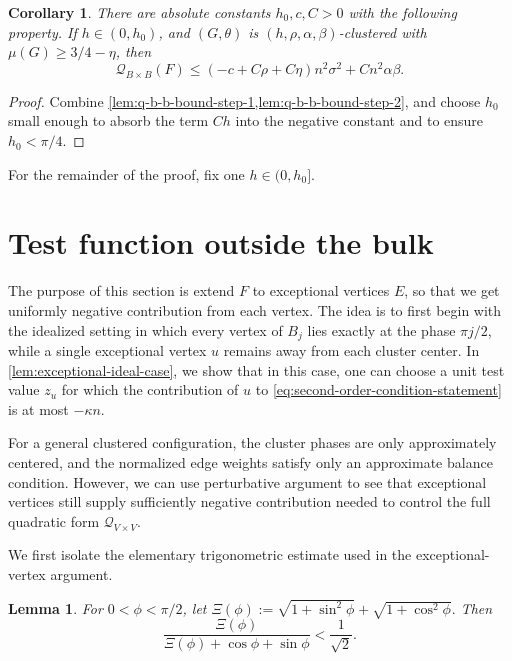 \documentclass[reqno,11pt]{amsart}
\newtheorem{lemma}{Lemma}
\newtheorem{corollary}{Corollary}
\theoremstyle{definition}
\newcommand{\cQ}{\mathcal{Q}}
\newcommand{\paren}[1]{\left(#1\right)}
\begin{document}
\begin{corollary}\label{cor:bulk-bound-main}
There are absolute constants $h_0,c,C>0$ with the following property.
If $h \in (0, h_0)$, and  $(G,\theta)$ is
$(h,\rho,\alpha,\beta)$-clustered with $\mu(G)\ge3/4-\eta$, then
\begin{equation}\label{eq:bulk-bound-main}
\cQ_{B\times B}(F)
\le\paren{-c+C\rho+C\eta}n^2\sigma^2
  +Cn^2\alpha\beta.
\end{equation}
\end{corollary}

\begin{proof}
Combine \cref{lem:q-b-b-bound-step-1,lem:q-b-b-bound-step-2}, and choose
$h_0$ small enough to absorb the term $Ch$ into the negative constant
and to ensure $h_0<\pi/4$.
\end{proof}

For the remainder of the proof, fix one $h\in(0,h_0]$.

\section{Test function outside the bulk}\label{sec:exceptional}

The purpose of this section is extend $F$ to exceptional vertices $E$, so that we get  uniformly negative contribution from each vertex. The idea is to first begin with the idealized setting in which every vertex of \(B_j\) lies exactly at the phase \(\pi j/2\), while a single exceptional vertex \(u\) remains away from each cluster center. In \cref{lem:exceptional-ideal-case}, we show that in this case, one can choose a unit test value \(z_u\) for which the contribution of \(u\) to \eqref{eq:second-order-condition-statement} is at most \(-\kappa n\).

For a general clustered configuration, the cluster phases are only approximately centered, and the normalized edge weights satisfy only an approximate balance condition. However, we can use perturbative argument to see that exceptional vertices still supply sufficiently negative contribution needed to control the full quadratic form \(\cQ_{V\times V}\).

We first isolate the elementary trigonometric estimate used in the exceptional-vertex argument.

\begin{lemma}\label{lem:trig-ineq}
For $0<\phi<\pi/2$, let $\Xi(\phi):=\sqrt{1+\sin^2\phi}+\sqrt{1+\cos^2\phi}.$ Then
\[
    \frac{\Xi(\phi)}
    {\Xi(\phi)+\cos\phi+\sin\phi}<\frac1{\sqrt2}.
\]
\end{lemma}
\end{document}
